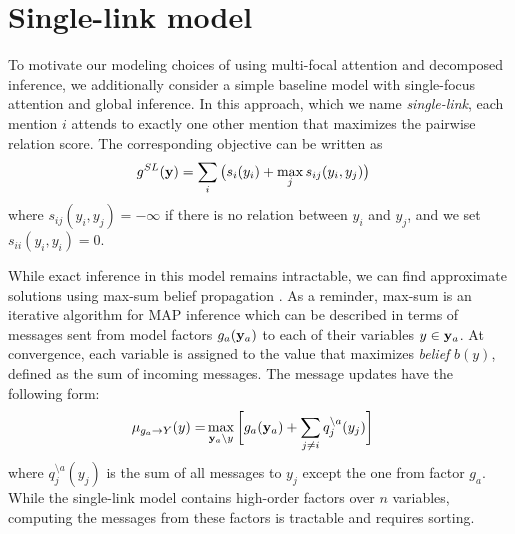 \section{Single-link model}
\label{sec:maxsum}

To motivate our modeling choices of using multi-focal attention and decomposed inference, we additionally consider a simple baseline model with single-focus attention and global inference. In this approach, which we name \emph{single-link}, each mention $i$ attends to exactly one other mention that maximizes the pairwise relation score. The corresponding objective can be written as
\begin{align}
g^{SL}({\bf y}) &= \sum_i \big( s_i(y_i) + \max_{j} s_{ij}(y_i, y_j) \big)
\end{align}
where $s_{ij}(y_i, y_j) = -\infty$ if there is no relation between $y_i$ and $y_j$, and we set $s_{ii}(y_i, y_i)=0$.

While exact inference in this model remains intractable, we can find approximate solutions using max-sum belief propagation \cite{Kschischang2001}. 
As a reminder, max-sum is an iterative algorithm for MAP inference which can be described in terms of messages sent from model factors $g_a({\bf y}_a)$ to each of their variables $y \in {\bf y}_a$. At convergence, each variable is assigned to the value that maximizes \emph{belief} $b(y)$, defined as the sum of incoming messages. The message updates have the following form:
\begin{align}
\mu_{g_a \rightarrow Y}(y) =& \max_{ {\bf y}_a \setminus y } \bigg[ g_a({\bf y}_a) + \sum_{j \neq i} q_j^{\setminus a}(y_j)\bigg]
\label{eq:damping}
\end{align}
\noindent where $q_j^{\setminus a}(y_j)$ is the sum of all messages to $y_j$ except the one from factor $g_a$. 
While the single-link model contains high-order factors over $n$ variables, computing the messages from these factors is tractable and requires sorting.


